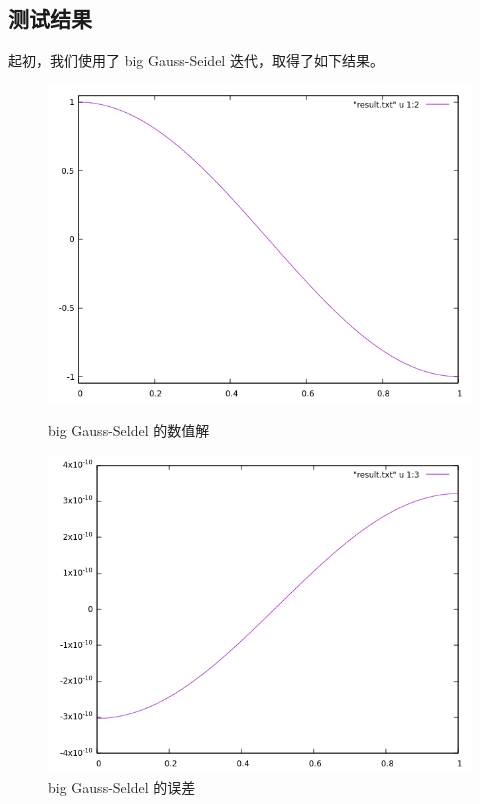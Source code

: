 \documentclass[lang=cn,11pt,a4paper]{elegantpaper}
\begin{document}
\subsection{测试结果}

起初，我们使用了 big Gauss-Seidel 迭代，取得了如下结果。

\begin{figure}[H]
    \centering
    \begin{minipage}[t]{0.48\textwidth}
        \centering
        \includegraphics[width=0.9\linewidth]{png/p2-solution}
        \caption{\small big Gauss-Seldel 的数值解}
    \end{minipage}
    \hspace{1em}
    \begin{minipage}[t]{0.48\textwidth}
        \centering
        \includegraphics[width=0.9\linewidth]{png/p2-error}
        \caption{\small big Gauss-Seldel 的误差}
    \end{minipage}
\end{figure}
\end{document}
